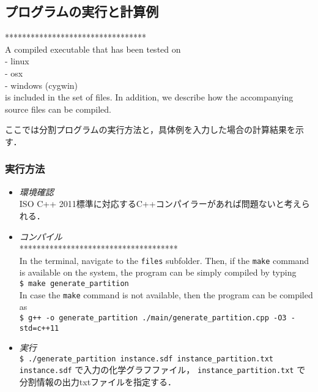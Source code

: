 \documentclass[11pt,titlepage,dvipdfmx,twoside]{jarticle}
\begin{document}

\subsection{プログラムの実行と計算例}
\label{sec:Example_p}

*********************************\\
A compiled executable that has been tested on\\
- linux \\
- osx \\
- windows (cygwin) \\
is included in the set of files.
In addition, we describe how the accompanying source files can be compiled.

ここでは分割プログラムの実行方法と，具体例を入力した場合の計算結果を示す．

\subsubsection{実行方法}
\label{sec:compile_p}
\begin{itemize}
	\item {\em 環境確認}\\
		ISO C++ 2011標準に対応するC++コンパイラーがあれば問題ないと考えられる．
	\item {\em コンパイル}\\
	      ************************************* \\
	      In the terminal, navigate to the {\tt files} subfolder.
	      Then, if the {\tt make} command is available on the system, the program can be simply compiled by typing \\
	      \verb|$ make generate_partition|\\
	      In case the {\tt make} command is not available, then the program can be compiled as \\	
		\verb|$ g++ -o generate_partition ./main/generate_partition.cpp -O3 -std=c++11|
	\item {\em 実行}\\
		\verb|$ ./generate_partition instance.sdf instance_partition.txt|\\
		\verb|instance.sdf| で入力の化学グラフファイル，
	  \verb|instance_partition.txt| で分割情報の出力txtファイルを指定する．
\end{itemize}
\end{document}
